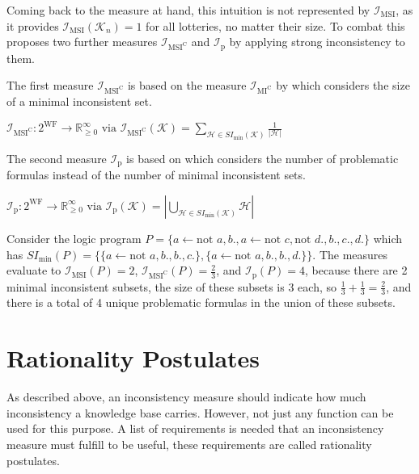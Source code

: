 Coming back to the measure at hand, this intuition is not represented by \(\mathcal{I}_{\text{MSI}}\), as it provides \(\mathcal{I}_{\text{MSI}}(\mathcal{K}_n) = 1\) for all lotteries, no matter their size. To combat this \cite{ulbricht_handling_2020} proposes two further measures \(\mathcal{I}_{\text{MSI}^\text{C}}\) and \(\mathcal{I}_{\text{p}}\) by applying strong inconsistency to them.

The first measure \(\mathcal{I}_{\text{MSI}^\text{C}}\) is based on the measure \(\mathcal{I}_{\text{MI}^{\text{C}}}\) by \cite{hunter_measuring_2008} which considers the size of a minimal inconsistent set.

\begin{definition}
    \(\mathcal{I}_{\text{MSI}^\text{C}}: 2^{\text{WF}} \rightarrow \mathbb{R}_{\geq 0}^{\infty} \text{ via } \mathcal{I}_{\text{MSI}^\text{C}}(\mathcal{K}) = \sum\limits_{\mathcal{H} \in SI_{\min}(\mathcal{K})} \frac{1}{|\mathcal{H}|}\)
\end{definition}

The second measure \(\mathcal{I}_{\text{p}}\) is based on \cite{liu_measuring_2011} which considers the number of problematic formulas instead of the number of minimal inconsistent sets.

\begin{definition}
    \(\mathcal{I}_{\text{p}}: 2^{\text{WF}} \rightarrow \mathbb{R}_{\geq 0}^{\infty} \text{ via } \mathcal{I}_{\text{p}}(\mathcal{K}) = \left| \bigcup\limits_{\mathcal{H} \in SI_{\min}(\mathcal{K})} \mathcal{H} \right|\)
\end{definition}

\begin{example}
    Consider the logic program \(P = \{a \leftarrow \text{not }a, b., a \leftarrow \text{not }c, \text{not }d., b., c., d.\}\) which has \(SI_{\min}(P) = \{\{a \leftarrow \text{not }a, b., b., c.\}, \{a \leftarrow \text{not }a, b., b., d.\}\}\). The measures evaluate to \(\mathcal{I}_{\text{MSI}}(P) = 2\), \(\mathcal{I}_{\text{MSI}^\text{C}}(P) = \frac{2}{3}\), and \(\mathcal{I}_{\text{p}}(P) = 4\), because there are 2 minimal inconsistent subsets, the size of these subsets is 3 each, so \(\frac{1}{3}+\frac{1}{3} = \frac{2}{3}\), and there is a total of 4 unique problematic formulas in the union of these subsets.
\end{example}

\section{Rationality Postulates}
As described above, an inconsistency measure should indicate how much inconsistency a knowledge base carries. However, not just any function can be used for this purpose. A list of requirements is needed that an inconsistency measure must fulfill to be useful, these requirements are called rationality postulates.

